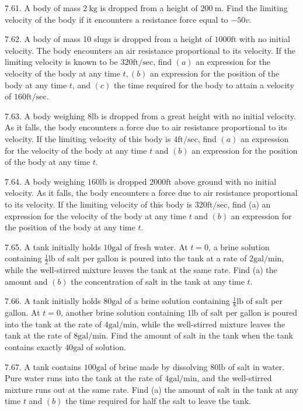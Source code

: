\documentclass[10pt]{article}
\begin{document}
7.61. A body of mass $2 \mathrm{~kg}$ is dropped from a height of $200 \mathrm{~m}$. Find the limiting velocity of the body if it encounters a resistance force equal to $-50 v$.

7.62. A body of mass 10 slugs is dropped from a height of $1000 \mathrm{ft}$ with no initial velocity. The body encounters an air resistance proportional to its velocity. If the limiting velocity is known to be $320 \mathrm{ft} / \mathrm{sec}$, find $(a)$ an expression for the velocity of the body at any time $t,(b)$ an expression for the position of the body at any time $t$, and $(c)$ the time required for the body to attain a velocity of $160 \mathrm{ft} / \mathrm{sec}$.

7.63. A body weighing $8 \mathrm{lb}$ is dropped from a great height with no initial velocity. As it falls, the body encounters a force due to air resistance proportional to its velocity. If the limiting velocity of this body is $4 \mathrm{ft} / \mathrm{sec}$, find $(a)$ an expression for the velocity of the body at any time $t$ and $(b)$ an expression for the position of the body at any time $t$.

7.64. A body weighing $160 \mathrm{lb}$ is dropped $2000 \mathrm{ft}$ above ground with no initial velocity. As it falls, the body encounters a force due to air resistance proportional to its velocity. If the limiting velocity of this body is $320 \mathrm{ft} / \mathrm{sec}$, find (a) an expression for the velocity of the body at any time $t$ and $(b)$ an expression for the position of the body at any time $t$.

7.65. A tank initially holds $10 \mathrm{gal}$ of fresh water. At $t=0$, a brine solution containing $\frac{1}{2} \mathrm{lb}$ of salt per gallon is poured into the tank at a rate of $2 \mathrm{gal} / \mathrm{min}$, while the well-stirred mixture leaves the tank at the same rate. Find (a) the amount and $(b)$ the concentration of salt in the tank at any time $t$.

7.66. A tank initially holds $80 \mathrm{gal}$ of a brine solution containing $\frac{1}{8} \mathrm{lb}$ of salt per gallon. At $t=0$, another brine solution containing $1 \mathrm{lb}$ of salt per gallon is poured into the tank at the rate of $4 \mathrm{gal} / \mathrm{min}$, while the well-stirred mixture leaves the tank at the rate of $8 \mathrm{gal} / \mathrm{min}$. Find the amount of salt in the tank when the tank contains exactly $40 \mathrm{gal}$ of solution.

7.67. A tank contains $100 \mathrm{gal}$ of brine made by dissolving $80 \mathrm{lb}$ of salt in water. Pure water runs into the tank at the rate of $4 \mathrm{gal} / \mathrm{min}$, and the well-stirred mixture runs out at the same rate. Find (a) the amount of salt in the tank at any time $t$ and $(b)$ the time required for half the salt to leave the tank.
\end{document}
